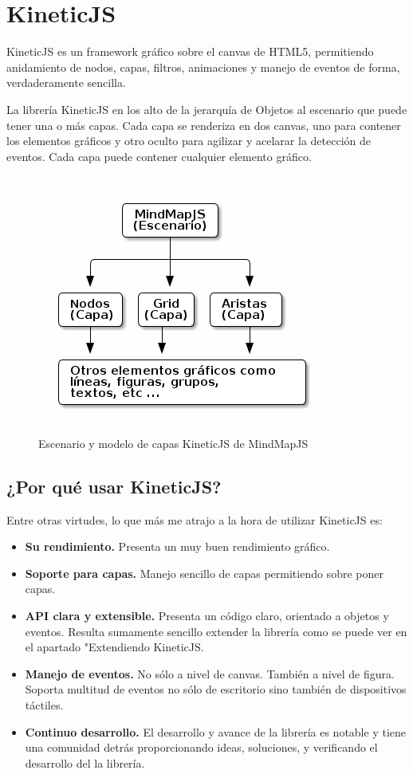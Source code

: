 \section{KineticJS}
KineticJS es un framework gráfico sobre el canvas de HTML5, permitiendo anidamiento de nodos, capas, filtros, animaciones y manejo de eventos de forma, verdaderamente sencilla. 

La librería KineticJS en los alto de la jerarquía de Objetos al escenario que puede tener una o más capas. Cada capa se renderiza en dos canvas, uno para contener los elementos gráficos y otro oculto para agilizar y acelarar la detección de eventos. Cada capa puede contener cualquier elemento gráfico.

\begin{figure}[tbph]
\centering
\includegraphics[width=0.6\linewidth]{imagenes/diagrama-kineticjs.png}
\caption{Escenario y modelo de capas KineticJS de MindMapJS}
\label{fig:escenario-capas}
\end{figure}


\subsection{¿Por qué usar KineticJS?}
Entre otras virtudes, lo que más me atrajo a la hora de utilizar KineticJS es:
\begin{itemize}
\item \textbf{Su rendimiento.} Presenta un muy buen rendimiento gráfico. 
\item \textbf{Soporte para capas.} Manejo sencillo de capas permitiendo sobre poner capas.
\item \textbf{API clara y extensible.} Presenta un código claro, orientado a objetos y eventos. Resulta sumamente sencillo extender la librería como se puede ver en el apartado "Extendiendo KineticJS.
\item \textbf{Manejo de eventos.} No sólo a nivel de canvas. También a nivel de figura. Soporta multitud de eventos no sólo de escritorio sino también de dispositivos táctiles.
\item \textbf{Continuo desarrollo.} El desarrollo y avance de la librería es notable y tiene una comunidad detrás proporcionando ideas, soluciones, y verificando el desarrollo del la librería.
\end{itemize}

